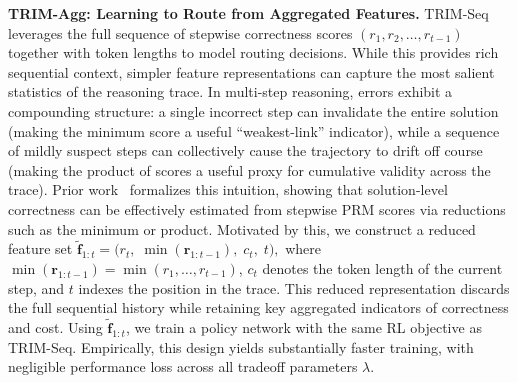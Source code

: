 \documentclass{article}
\theoremstyle{plain}
\theoremstyle{definition}
\theoremstyle{remark}
\begin{document}
\textbf{TRIM-Agg: Learning to Route from Aggregated Features.}
TRIM-Seq leverages the full sequence of stepwise correctness scores $(r_1, r_2, \ldots, r_{t-1})$ together with token lengths to model routing decisions. While this provides rich sequential context, simpler feature representations can capture the most salient statistics of the reasoning trace. In multi-step reasoning, errors exhibit a compounding structure: a single incorrect step can invalidate the entire solution (making the minimum score a useful “weakest-link” indicator), while a sequence of mildly suspect steps can collectively cause the trajectory to drift off course (making the product of scores a useful proxy for cumulative validity across the trace). Prior work~\citep{prm800k, mathshephard} formalizes this intuition, showing that solution-level correctness can be effectively estimated from stepwise PRM scores via reductions such as the minimum or product.
Motivated by this, we construct a reduced feature set
$
\tilde{\mathbf{f}}_{1:t} = \big(r_t,\; \min(\mathbf{r}_{1:t-1}),\; c_t,\; t \big),
$
where $\min(\mathbf{r}_{1:t-1}) = \min(r_1, \ldots, r_{t-1})$, $c_t$ denotes the token length of the current step, and $t$ indexes the position in the trace. 
This reduced representation discards the full sequential history while retaining key aggregated indicators of correctness and cost. Using $\tilde{\mathbf{f}}_{1:t}$, we train a policy network with the same RL objective as TRIM-Seq. Empirically, this design yields substantially faster training, with negligible performance loss across all tradeoff parameters $\lambda$.

\vspace{-0.2cm}
\end{document}
